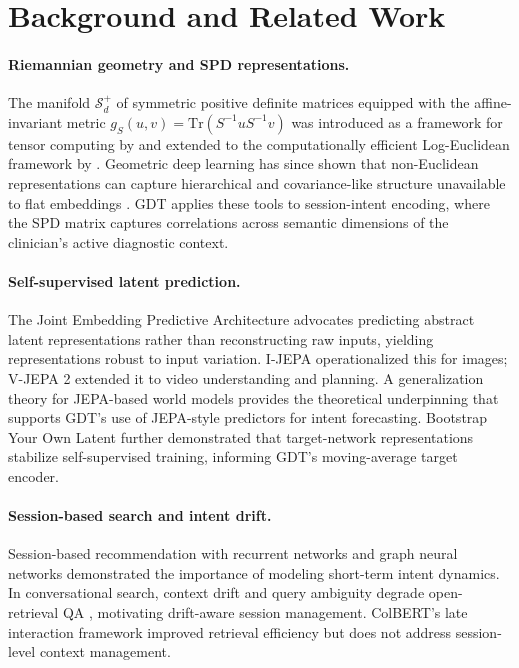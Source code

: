 \documentclass[11pt]{article}
\begin{document}
\section{Background and Related Work}
\label{sec:background}

\paragraph{Riemannian geometry and SPD representations.}
The manifold $\mathcal{S}_d^+$ of symmetric positive definite matrices equipped with the affine-invariant metric $g_S(u,v) = \mathrm{Tr}(S^{-1}uS^{-1}v)$ was introduced as a framework for tensor computing by \citet{pennec2006_spd} and extended to the computationally efficient Log-Euclidean framework by \citet{arsigny2007_logeuclidean}. Geometric deep learning has since shown that non-Euclidean representations can capture hierarchical and covariance-like structure unavailable to flat embeddings \citep{bronstein2017}. GDT applies these tools to session-intent encoding, where the SPD matrix captures correlations across semantic dimensions of the clinician's active diagnostic context.

\paragraph{Self-supervised latent prediction.}
The Joint Embedding Predictive Architecture \citep{lecun2022} advocates predicting abstract latent representations rather than reconstructing raw inputs, yielding representations robust to input variation. I-JEPA \citep{assran2023_ijepa} operationalized this for images; V-JEPA 2 \citep{assran2025_vjepa2} extended it to video understanding and planning. A generalization theory for JEPA-based world models \citep{cui2026_jepa_theory} provides the theoretical underpinning that supports GDT's use of JEPA-style predictors for intent forecasting. Bootstrap Your Own Latent \citep{grill20} further demonstrated that target-network representations stabilize self-supervised training, informing GDT's moving-average target encoder.

\paragraph{Session-based search and intent drift.}
Session-based recommendation with recurrent networks \citep{hidasi2015} and graph neural networks \citep{wu2019_session} demonstrated the importance of modeling short-term intent dynamics. In conversational search, context drift and query ambiguity degrade open-retrieval QA \citep{iyyer20,zamani20}, motivating drift-aware session management. ColBERT's late interaction framework \citep{khattab20} improved retrieval efficiency but does not address session-level context management.
\end{document}
